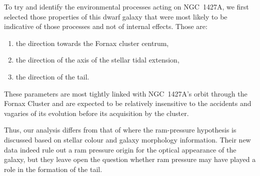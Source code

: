 To try and identify the environmental processes acting on NGC~1427A, we first selected those properties of this dwarf galaxy that were most likely to be indicative of those processes and not of internal effects. Those are:
\begin{enumerate}
    \item the direction towards the Fornax cluster centrum,
    \item the direction of the axis of the stellar tidal extension,
    \item the direction of the \Hi{} tail.
\end{enumerate}
These parameters are most tightly linked with NGC~1427A's orbit through the Fornax Cluster and are expected to be relatively insensitive to the accidents and vagaries of its evolution before its acquisition by the cluster.

Thus, our analysis differs from that of \citet{Lee-Waddell2018} where the ram-pressure hypothesis is discussed based on stellar colour and galaxy morphology information.
Their new data indeed rule out a ram pressure origin for the optical appearance of the galaxy, but they leave open the question whether ram pressure may have played a role in the formation of the \Hi{} tail.






